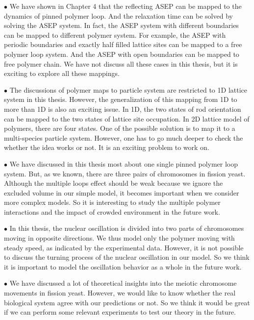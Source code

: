 $\bullet$ We have shown in Chapter 4 that the reflecting ASEP can be mapped to the dynamics of pinned polymer loop. And the relaxation time can be solved by solving the ASEP system. In fact, the ASEP system with different boundaries can be mapped to different polymer system. For example, the ASEP with periodic boundaries and exactly half filled lattice sites can be mapped to a free polymer loop system. And the ASEP with open boundaries can be mapped to free polymer chain. We have not discuss all these cases in this thesis, but it is exciting to explore all these mappings. 

$\bullet$ The discussions of polymer maps to particle system are restricted to 1D lattice system in this thesis. However, the generalization of this mapping from 1D to more than 1D is also an exciting issue. In 1D, the two states of rod orientation can be mapped to the two states of lattice site occupation. In 2D lattice model of polymers, there are four states. One of the possible solution is to map it to a multi-species particle system. However, one has to go much deeper to check the whether the idea works or not. It is an exciting problem to work on.

$\bullet$ We have discussed in this thesis most about one single pinned polymer loop system. But, as we known, there are three pairs of chromosomes in fission yeast. Although the multiple loops effect should be weak because we ignore the excluded volume in our simple model, it becomes important when we consider more complex models. So it is interesting to study the multiple polymer interactions and the impact of crowded environment in the future work.

$\bullet$ In this thesis, the nuclear oscillation is divided into two parts of chromosomes moving in opposite directions. We thus model only the polymer moving with steady speed, as indicated by the experimental data. However, it is not possible to discuss the turning process of the nuclear oscillation in our model. So we think it is important to model the oscillation behavior as a whole in the future work.

$\bullet$ We have discussed a lot of theoretical insights into the meiotic chromosome movements in fission yeast. However, we would like to know whether the real biological system agree with our predictions or not. So we think it would be great if we can perform some relevant experiments to test our theory in the future. 


